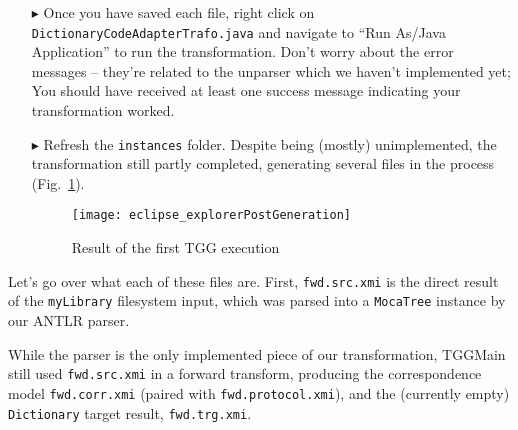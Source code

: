\begin{itemize} 

\item[$\blacktriangleright$] Once you have saved each file, right click on \texttt{Dict\-ion\-ar\-y\-Code\-Ad\-ap\-ter\-Traf\-o.\-java} and navigate to ``Run
As/Java Application'' to run the transformation. Don't worry about the error messages -- they're related to the unparser which we haven't implemented yet; You
should have received at least one success message indicating your transformation worked.

\item[$\blacktriangleright$] Refresh the \texttt{instances} folder. Despite being (mostly) unimplemented, the transformation still partly completed, generating
several files in the process (Fig.~\ref{eclipse:postParse}).

\vspace{0.5cm}

\begin{figure}[!htbp]
\begin{center}
 \texttt{[image: eclipse\_explorerPostGeneration]}
  \caption{Result of the first TGG execution}
  \label{eclipse:postParse}
\end{center}
\end{figure} 

\end{itemize}

Let's go over what each of these files are. First, \texttt{fwd.src.xmi} is the direct result of the \texttt{my\-Lib\-rary} filesystem input, which was parsed
into a \texttt{MocaTree} instance by our ANTLR parser. 

While the parser is the only implemented piece of our transformation, TGGMain still used \texttt{fwd.src.xmi} in a forward transform, producing
the correspondence model \texttt{fwd.corr.xmi} (paired with \texttt{fwd.protocol.xmi}), and the (currently empty) \texttt{Dictionary} target result,
\texttt{fwd.trg.xmi}.

\clearpage


